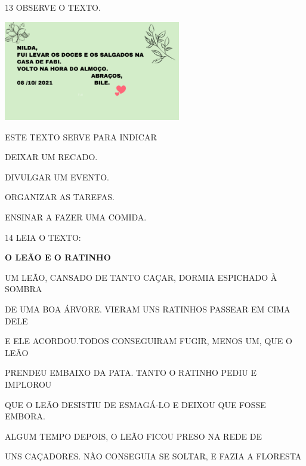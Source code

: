 
\num{13} OBSERVE O TEXTO.

\includegraphics[width=3.04633in,height=1.71374in]{media/image220.png}

ESTE TEXTO SERVE PARA INDICAR

\begin{escolha}
\item DEIXAR UM RECADO.

\item DIVULGAR UM EVENTO.

\item ORGANIZAR AS TAREFAS.

\item ENSINAR A FAZER UMA COMIDA.
\end{escolha}




\num{14} LEIA O TEXTO:

\textbf{O LEÃO E O RATINHO}

UM LEÃO, CANSADO DE TANTO CAÇAR, DORMIA ESPICHADO À SOMBRA

DE UMA BOA ÁRVORE. VIERAM UNS RATINHOS PASSEAR EM CIMA DELE

E ELE ACORDOU.TODOS CONSEGUIRAM FUGIR, MENOS UM, QUE O LEÃO

PRENDEU EMBAIXO DA PATA. TANTO O RATINHO PEDIU E IMPLOROU

QUE O LEÃO DESISTIU DE ESMAGÁ-LO E DEIXOU QUE FOSSE EMBORA.

ALGUM TEMPO DEPOIS, O LEÃO FICOU PRESO NA REDE DE

UNS CAÇADORES. NÃO CONSEGUIA SE SOLTAR, E FAZIA A FLORESTA

